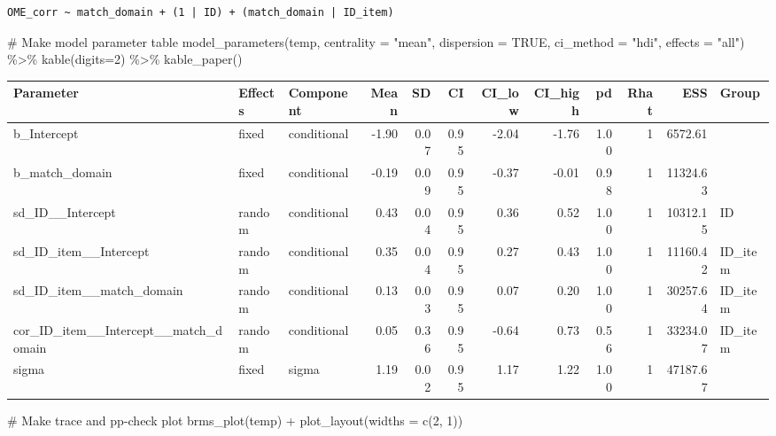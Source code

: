 \documentclass[
  letterpaper,
  DIV=11,
  numbers=noendperiod]{scrartcl}
\newenvironment{Shaded}{\begin{snugshade}}{\end{snugshade}}
\newcommand{\AttributeTok}[1]{\textcolor[rgb]{0.40,0.45,0.13}{#1}}
\newcommand{\CommentTok}[1]{\textcolor[rgb]{0.37,0.37,0.37}{#1}}
\newcommand{\ConstantTok}[1]{\textcolor[rgb]{0.56,0.35,0.01}{#1}}
\newcommand{\DecValTok}[1]{\textcolor[rgb]{0.68,0.00,0.00}{#1}}
\newcommand{\FunctionTok}[1]{\textcolor[rgb]{0.28,0.35,0.67}{#1}}
\newcommand{\NormalTok}[1]{\textcolor[rgb]{0.00,0.23,0.31}{#1}}
\newcommand{\SpecialCharTok}[1]{\textcolor[rgb]{0.37,0.37,0.37}{#1}}
\newcommand{\StringTok}[1]{\textcolor[rgb]{0.13,0.47,0.30}{#1}}
\begin{document}
\begin{verbatim}
OME_corr ~ match_domain + (1 | ID) + (match_domain | ID_item) 
\end{verbatim}

\begin{Shaded}
\begin{Highlighting}[]
\CommentTok{\# Make model parameter table}
\FunctionTok{model\_parameters}\NormalTok{(temp, }\AttributeTok{centrality =} \StringTok{"mean"}\NormalTok{, }\AttributeTok{dispersion =} \ConstantTok{TRUE}\NormalTok{, }
                 \AttributeTok{ci\_method =} \StringTok{"hdi"}\NormalTok{, }\AttributeTok{effects =} \StringTok{"all"}\NormalTok{) }\SpecialCharTok{\%\textgreater{}\%} 
  \FunctionTok{kable}\NormalTok{(}\AttributeTok{digits=}\DecValTok{2}\NormalTok{) }\SpecialCharTok{\%\textgreater{}\%} \FunctionTok{kable\_paper}\NormalTok{()}
\end{Highlighting}
\end{Shaded}

\begin{longtable*}[t]{lllrrrrrrrrl}
\toprule
Parameter & Effects & Component & Mean & SD & CI & CI\_low & CI\_high & pd & Rhat & ESS & Group\\
\midrule
b\_Intercept & fixed & conditional & -1.90 & 0.07 & 0.95 & -2.04 & -1.76 & 1.00 & 1 & 6572.61 & \\
b\_match\_domain & fixed & conditional & -0.19 & 0.09 & 0.95 & -0.37 & -0.01 & 0.98 & 1 & 11324.63 & \\
sd\_ID\_\_Intercept & random & conditional & 0.43 & 0.04 & 0.95 & 0.36 & 0.52 & 1.00 & 1 & 10312.15 & ID\\
sd\_ID\_item\_\_Intercept & random & conditional & 0.35 & 0.04 & 0.95 & 0.27 & 0.43 & 1.00 & 1 & 11160.42 & ID\_item\\
sd\_ID\_item\_\_match\_domain & random & conditional & 0.13 & 0.03 & 0.95 & 0.07 & 0.20 & 1.00 & 1 & 30257.64 & ID\_item\\
\addlinespace
cor\_ID\_item\_\_Intercept\_\_match\_domain & random & conditional & 0.05 & 0.36 & 0.95 & -0.64 & 0.73 & 0.56 & 1 & 33234.07 & ID\_item\\
sigma & fixed & sigma & 1.19 & 0.02 & 0.95 & 1.17 & 1.22 & 1.00 & 1 & 47187.67 & \\
\bottomrule
\end{longtable*}

\begin{Shaded}
\begin{Highlighting}[]
\CommentTok{\# Make trace and pp{-}check plot}
\FunctionTok{brms\_plot}\NormalTok{(temp)  }\SpecialCharTok{+} \FunctionTok{plot\_layout}\NormalTok{(}\AttributeTok{widths =} \FunctionTok{c}\NormalTok{(}\DecValTok{2}\NormalTok{, }\DecValTok{1}\NormalTok{))}
\end{Highlighting}
\end{Shaded}
\end{document}
